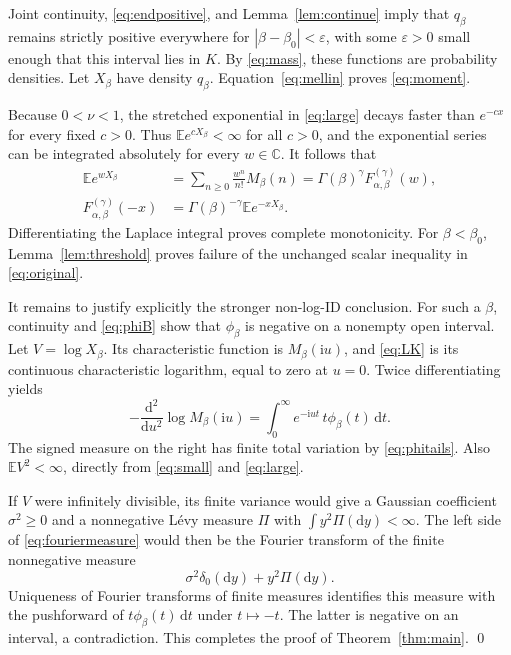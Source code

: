 \documentclass[11pt,a4paper]{article}
\numberwithin{equation}{section}
\theoremstyle{definition}\newtheorem{definition}[theorem]{Definition}
\theoremstyle{remark}\newtheorem{remark}[theorem]{Remark}
\newcommand{\C}{\mathbb C}
\newcommand{\E}{\mathbb E}
\newcommand{\ii}{\mathrm i}
\newcommand{\dd}{\,\mathrm d}
\begin{document}
Joint continuity, \eqref{eq:endpositive}, and
Lemma~\ref{lem:continue} imply that \(q_\beta\) remains strictly
positive everywhere for \(|\beta-\beta_0|<\varepsilon\), with
some \(\varepsilon>0\) small enough that this interval lies in
\(K\). By \eqref{eq:mass}, these functions are probability
densities. Let \(X_\beta\) have density \(q_\beta\).
Equation~\eqref{eq:mellin} proves \eqref{eq:moment}.

Because \(0<\nu<1\), the stretched exponential in
\eqref{eq:large} decays faster than \(e^{-cx}\) for every fixed
\(c>0\). Thus \(\E e^{cX_\beta}<\infty\) for all \(c>0\),
and the exponential series can be integrated absolutely for every
\(w\in\C\). It follows that
\begin{align}
 \E e^{wX_\beta}
 &=\sum_{n\ge0}\frac{w^n}{n!}M_\beta(n)
 =\Gamma(\beta)^\gamma F_{\alpha,\beta}^{(\gamma)}(w),
 \label{eq:mgf}\\
 F_{\alpha,\beta}^{(\gamma)}(-x)
 &=\Gamma(\beta)^{-\gamma}\E e^{-xX_\beta}.
 \label{eq:laplace}
\end{align}
Differentiating the Laplace integral proves complete monotonicity.
For \(\beta<\beta_0\), Lemma~\ref{lem:threshold} proves failure
of the unchanged scalar inequality in \eqref{eq:original}.

It remains to justify explicitly the stronger non-log-ID conclusion.
For such a \(\beta\), continuity and \eqref{eq:phiB} show that
\(\phi_\beta\) is negative on a nonempty open interval.
Let \(V=\log X_\beta\). Its characteristic function is
\(M_\beta(\ii u)\), and \eqref{eq:LK} is its continuous
characteristic logarithm, equal to zero at \(u=0\). Twice
differentiating yields
\begin{equation}\label{eq:fouriermeasure}
 -\frac{\mathrm d^2}{\mathrm du^2}\log M_\beta(\ii u)
 =\int_0^\infty e^{-\ii ut}\,t\phi_\beta(t)\dd t.
\end{equation}
The signed measure on the right has finite total variation by
\eqref{eq:phitails}. Also \(\E V^2<\infty\), directly from
\eqref{eq:small} and \eqref{eq:large}.

If \(V\) were infinitely divisible, its finite variance would give a
Gaussian coefficient \(\sigma^2\ge0\) and a nonnegative L\'evy
measure \(\Pi\) with \(\int y^2\Pi(\mathrm dy)<\infty\).
The left side of \eqref{eq:fouriermeasure} would then be the Fourier
transform of the finite nonnegative measure
\[
 \sigma^2\delta_0(\mathrm dy)+y^2\Pi(\mathrm dy).
\]
Uniqueness of Fourier transforms of finite measures identifies this
measure with the pushforward of \(t\phi_\beta(t)\,\mathrm dt\)
under \(t\mapsto-t\). The latter is negative on an interval, a
contradiction. This completes the proof of
Theorem~\ref{thm:main}. \qed
\end{document}
